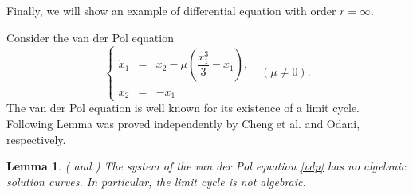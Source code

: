 \documentclass[preprint,12pt]{elsarticle}
\newtheorem{lem}[thm]{Lemma}
\begin{document}
Finally, we will show an example of differential equation with order $r=\infty$.

Consider the van der Pol equation
\begin{equation}
\label{vdp} \left\{\begin{array}{rcl} \dot{x}_1 &=& x_2 - \mu
(\dfrac{x_1^3}{3} - x_1),\\
\dot{x}_2 &=& -x_1 \end{array}\right.
 \ \ \ (\mu \not = 0).
\end{equation}
The van der Pol equation is well known for its existence of a limit cycle. 
Following Lemma was proved independently by Cheng et al.\cite{Cheng:95} and Odani\cite{Oda:95}, respectively. 

\begin{lem} (\cite{Cheng:95} and \cite{Oda:95})
\label{lem:vdp} The system of the van der Pol equation \eqref{vdp} has no algebraic solution curves. In particular, the limit cycle is not algebraic.
\end{lem}
\end{document}
